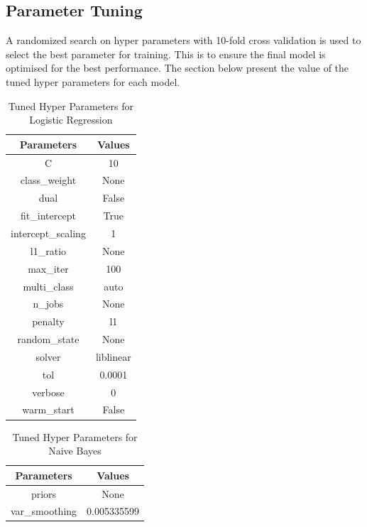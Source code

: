 \documentclass[conference]{IEEEtran}
\begin{document}
\subsection{Parameter Tuning}
A randomized search on hyper parameters with 10-fold cross validation is used to select the best parameter for training. This is to ensure the final model is optimised for the best performance. The section below present the value of the tuned hyper parameters for each model.
\begin{table}[!ht]
    \caption{Tuned Hyper Parameters for Logistic Regression}
    \centering
    \begin{tabular}{c c}
        \hline 
        \bfseries Parameters & \bfseries Values\\
        \hline  \hline
        C & 10\\
        class\_weight & None\\
        dual & False\\
        fit\_intercept & True\\
        intercept\_scaling & 1\\
        l1\_ratio & None\\
        max\_iter & 100\\
        multi\_class & auto\\
        n\_jobs & None\\
        penalty & l1\\
        random\_state & None\\
        solver & liblinear\\
        tol & 0.0001\\
        verbose & 0\\
        warm\_start & False\\
        \hline
    \end{tabular}
\end{table}

\begin{table}[!ht]
    \caption{Tuned Hyper Parameters for Naive Bayes}
    \centering
    \begin{tabular}{c c}
        \hline 
        \bfseries Parameters & \bfseries Values\\
        \hline  \hline
        priors & None\\
        var\_smoothing & 0.005335599\\
        \hline
    \end{tabular}
\end{table}
\end{document}
